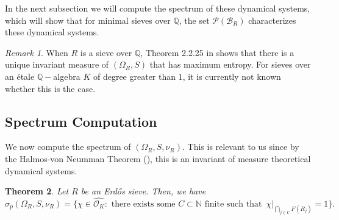 \documentclass[a4paper,11pt,reqno]{amsart}
\theoremstyle{plain}
\newtheorem{theorem}{Theorem}[section]
\theoremstyle{remark}
\newtheorem{remark}[theorem]{Remark}
\newcommand{\q}{\mathbb{Q}}
\newcommand{\cb}{\mathcal{B}}
\newcommand{\co}{\mathcal{O}}
\newcommand{\cp}{\mathcal{P}}
\begin{document}
			In the next subsection we will compute the spectrum of these dynamical systems, which will show that for minimal sieves over $\q$, the set $\cp(\cb_R)$ characterizes these dynamical systems. 
			
			\begin{remark}
				
				When $R$ is a sieve over $\q$,  Theorem 2.2.25 in \cite{Kulaga} shows that there is a unique invariant measure of $(\Omega_R,S)$ that has maximum entropy. For sieves over an étale $\q-$algebra $K$ of degree greater than $1$, it is currently not known whether this is the case.
			\end{remark}
			
			
			
			\subsection{Spectrum Computation} 
			
			We now compute the spectrum of  $(\Omega_R,S,\nu_R)$. This is relevant to us since by the Halmos-von Neumman Theorem (), this is an invariant of measure theoretical dynamical systems. 
			
			\begin{theorem}
				\label{thm:Spectrum}
				Let $R$ be an Erdős sieve. Then, we have $$\sigma_p(\Omega_R,S, \nu_R) =  \{\chi \in \widehat{\co_K}: \text{ there exists some } C \subset \mathbb{N} \text{ finite such that } \hspace{2pt}   \chi\vert_{\bigcap_{j\in C}F(R_j)} = 1\} .$$ 
				
			\end{theorem}
			
\end{document}
